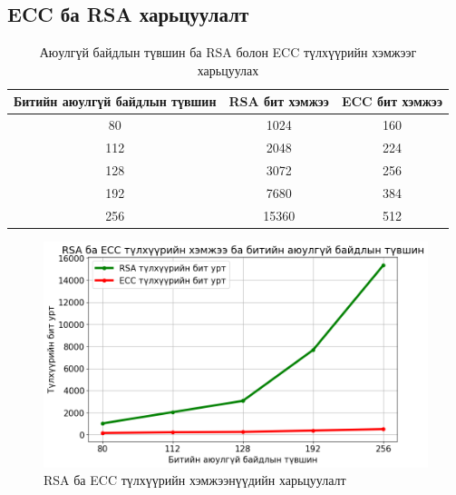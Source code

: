 \subsection{ECC ба RSA харьцуулалт}
\begin{table}[h]
	\centering
	\begin{tabular}{|c|c|c|}
	\hline
	\textbf{Битийн аюулгүй байдлын түвшин} & \textbf{RSA бит хэмжээ} & \textbf{ECC бит хэмжээ} \\ \hline
	80                          & 1024                      & 160                       \\ \hline
	112                         & 2048                      & 224                       \\ \hline
	128                         & 3072                      & 256                       \\ \hline
	192                         & 7680                      & 384                       \\ \hline
	256                         & 15360                     & 512                       \\ \hline
	\end{tabular}
	\caption{Аюулгүй байдлын түвшин ба RSA болон ECC түлхүүрийн хэмжээг харьцуулах \cite{RSAvsECC}}
	\label{tab:rsa_ecc_key_sizes}
	\end{table}
	
	\begin{figure}[h]
		\centering
		\includegraphics[scale=0.6]{assets/graphs/keysize.png}
		\caption{RSA ба ECC түлхүүрийн хэмжээнүүдийн харьцуулалт}
		\label{fig:architecture}
	\end{figure}

